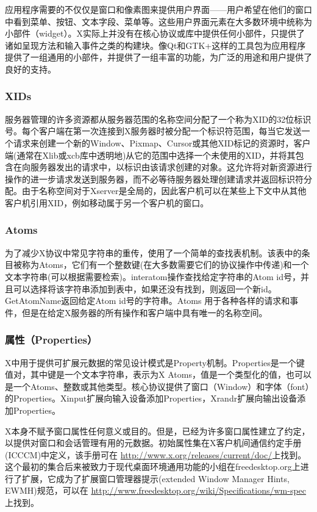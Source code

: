 应用程序需要的不仅仅是窗口和像素图来提供用户界面——用户希望在他们的窗口中看到菜单、按钮、文本字段、菜单等。这些用户界面元素在大多数环境中统称为小部件（widget）。X实际上并没有在核心协议或库中提供任何小部件，只提供了诸如呈现方法和输入事件之类的构建块。像Qt和GTK+这样的工具包为应用程序提供了一组通用的小部件，并提供了一组丰富的功能，为广泛的用途和用户提供了良好的支持。

\subsubsection{XIDs}

服务器管理的许多资源都从服务器范围的名称空间分配了一个称为XID的32位标识号。每个客户端在第一次连接到X服务器时被分配一个标识符范围，每当它发送一个请求来创建一个新的Window、Pixmap、Cursor或其他XID标记的资源时，客户端(通常在Xlib或xcb库中透明地)从它的范围中选择一个未使用的XID，并将其包含在向服务器发出的请求中，以标识由该请求创建的对象。这允许将对新资源进行操作的进一步请求发送到服务器，而不必等待服务器处理创建请求并返回标识符分配。由于名称空间对于Xserver是全局的，因此客户机可以在某些上下文中从其他客户机引用XID，例如移动属于另一个客户机的窗口。

\subsubsection{Atoms}

为了减少X协议中常见字符串的重传，使用了一个简单的查找表机制。该表中的条目被称为Atoms，它们有一个整数键(在大多数需要它们的协议操作中传递)和一个文本字符串(可以根据需要检索)。interatom操作查找给定字符串的Atom id号，并且可以选择将该字符串添加到表中，如果还没有找到，则返回一个新id。GetAtomName返回给定Atom id号的字符串。Atoms 用于各种各样的请求和事件，但是在给定X服务器的所有操作和客户端中具有唯一的名称空间。

\subsubsection{属性（Properties）}

X中用于提供可扩展元数据的常见设计模式是Property机制。Properties是一个键值对，其中键是一个文本字符串，表示为X Atoms，值是一个类型化的值，也可以是一个Atoms、整数或其他类型。核心协议提供了窗口（Window）和字体（font）的Properties。Xinput扩展向输入设备添加Properties，Xrandr扩展向输出设备添加Properties。

X本身不赋予窗口属性任何意义或目的。但是，已经为许多窗口属性建立了约定，以提供对窗口和会话管理有用的元数据。初始属性集在X客户机间通信约定手册(ICCCM)中定义，该手册可在 \url{http://www.x.org/releases/current/doc/}上找到。这个最初的集合后来被致力于现代桌面环境通用功能的小组在freedesktop.org上进行了扩展，它成为了扩展窗口管理器提示(extended Window Manager Hints, EWMH)规范，可以在 \url{http://www.freedesktop.org/wiki/Specifications/wm-spec}上找到。

